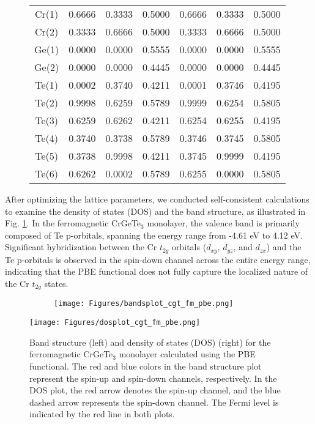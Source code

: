 \begin{figure}[H]
\begin{minipage}[b]{.55\linewidth}
{\begin{tabular}{ccccccc}
	Cr(1)   & 0.6666 & 0.3333 & 0.5000 & 0.6666 &  0.3333 & 0.5000 \\
	Cr(2)   & 0.3333 & 0.6666 & 0.5000 & 0.3333 &  0.6666 & 0.5000 \\
	Ge(1)   & 0.0000 & 0.0000 & 0.5555 & 0.0000 &  0.0000 & 0.5555 \\ 
	Ge(2)   & 0.0000 & 0.0000 & 0.4445 & 0.0000 &  0.0000 & 0.4445 \\
	Te(1)   & 0.0002 & 0.3740 & 0.4211 & 0.0001 &  0.3746 & 0.4195 \\
	Te(2)   & 0.9998 & 0.6259 & 0.5789 & 0.9999 &  0.6254 & 0.5805 \\
	Te(3)   & 0.6259 & 0.6262 & 0.4211 & 0.6254 &  0.6255 & 0.4195 \\
	Te(4)   & 0.3740 & 0.3738 & 0.5789 & 0.3746 &  0.3745 & 0.5805 \\
	Te(5)   & 0.3738 & 0.9998 & 0.4211 & 0.3745 &  0.9999 & 0.4195 \\
	Te(6)   & 0.6262 & 0.0002 & 0.5789 & 0.6255 &  0.0000 & 0.5805 \\
	\bottomrule
	\bottomrule
\end{tabular}
}
	\end{minipage}
\end{figure}
	
After optimizing the lattice parameters, we conducted self-consistent calculations to examine the density of states (DOS) and the band structure, as illustrated in Fig. \ref{fig:4.4}. In the ferromagnetic CrGeTe\(_3\) monolayer, the valence band is primarily composed of Te p-orbitals, spanning the energy range from -4.61 eV to 4.12 eV. Significant hybridization between the Cr $t_{2g}$ orbitals ($d_{xy}$, $d_{yz}$, and $d_{zx}$) and the Te p-orbitals is observed in the spin-down channel across the entire energy range, indicating that the PBE functional does not fully capture the localized nature of the Cr $t_{2g}$ states.

\begin{figure}[H]
	\begin{subfigure}{.5\textwidth}
		\centering
		\texttt{[image: Figures/bandsplot\_cgt\_fm\_pbe.png]}
	\end{subfigure}%
	\begin{minipage}{.5\textwidth}
		\vspace{-12.6cm}
		\centering
		\texttt{[image: Figures/dosplot\_cgt\_fm\_pbe.png]}
		\captionsetup{justification=centering}
	\end{minipage}
	\caption{Band structure (left) and density of states (DOS) (right) for the ferromagnetic CrGeTe$_{3}$ monolayer calculated using the PBE functional. The red and blue colors in the band structure plot represent the spin-up and spin-down channels, respectively. In the DOS plot, the red arrow denotes the spin-up channel, and the blue dashed arrow represents the spin-down channel. The Fermi level is indicated by the red line in both plots.}
	\label{fig:4.4}
\end{figure}

